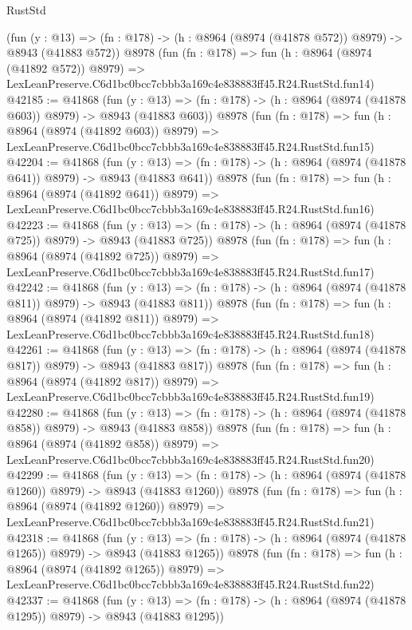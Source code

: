 \begin{lexlean}{RustStd}
\begin{coremodule}
    (fun (y : @13) => (fn : @178) -> (h : @8964 (@8974 (@41878 @572)) @8979) -> @8943 (@41883 @572))
    @8978
    (fun (fn : @178) =>
    fun (h : @8964 (@8974 (@41892 @572)) @8979) =>
    LexLeanPreserve.C6d1bc0bcc7cbbb3a169c4e838883ff45.R24.RustStd.fun14)
@42185 := @41868
    (fun (y : @13) => (fn : @178) -> (h : @8964 (@8974 (@41878 @603)) @8979) -> @8943 (@41883 @603))
    @8978
    (fun (fn : @178) =>
    fun (h : @8964 (@8974 (@41892 @603)) @8979) =>
    LexLeanPreserve.C6d1bc0bcc7cbbb3a169c4e838883ff45.R24.RustStd.fun15)
@42204 := @41868
    (fun (y : @13) => (fn : @178) -> (h : @8964 (@8974 (@41878 @641)) @8979) -> @8943 (@41883 @641))
    @8978
    (fun (fn : @178) =>
    fun (h : @8964 (@8974 (@41892 @641)) @8979) =>
    LexLeanPreserve.C6d1bc0bcc7cbbb3a169c4e838883ff45.R24.RustStd.fun16)
@42223 := @41868
    (fun (y : @13) => (fn : @178) -> (h : @8964 (@8974 (@41878 @725)) @8979) -> @8943 (@41883 @725))
    @8978
    (fun (fn : @178) =>
    fun (h : @8964 (@8974 (@41892 @725)) @8979) =>
    LexLeanPreserve.C6d1bc0bcc7cbbb3a169c4e838883ff45.R24.RustStd.fun17)
@42242 := @41868
    (fun (y : @13) => (fn : @178) -> (h : @8964 (@8974 (@41878 @811)) @8979) -> @8943 (@41883 @811))
    @8978
    (fun (fn : @178) =>
    fun (h : @8964 (@8974 (@41892 @811)) @8979) =>
    LexLeanPreserve.C6d1bc0bcc7cbbb3a169c4e838883ff45.R24.RustStd.fun18)
@42261 := @41868
    (fun (y : @13) => (fn : @178) -> (h : @8964 (@8974 (@41878 @817)) @8979) -> @8943 (@41883 @817))
    @8978
    (fun (fn : @178) =>
    fun (h : @8964 (@8974 (@41892 @817)) @8979) =>
    LexLeanPreserve.C6d1bc0bcc7cbbb3a169c4e838883ff45.R24.RustStd.fun19)
@42280 := @41868
    (fun (y : @13) => (fn : @178) -> (h : @8964 (@8974 (@41878 @858)) @8979) -> @8943 (@41883 @858))
    @8978
    (fun (fn : @178) =>
    fun (h : @8964 (@8974 (@41892 @858)) @8979) =>
    LexLeanPreserve.C6d1bc0bcc7cbbb3a169c4e838883ff45.R24.RustStd.fun20)
@42299 := @41868
    (fun (y : @13) =>
    (fn : @178) -> (h : @8964 (@8974 (@41878 @1260)) @8979) -> @8943 (@41883 @1260))
    @8978
    (fun (fn : @178) =>
    fun (h : @8964 (@8974 (@41892 @1260)) @8979) =>
    LexLeanPreserve.C6d1bc0bcc7cbbb3a169c4e838883ff45.R24.RustStd.fun21)
@42318 := @41868
    (fun (y : @13) =>
    (fn : @178) -> (h : @8964 (@8974 (@41878 @1265)) @8979) -> @8943 (@41883 @1265))
    @8978
    (fun (fn : @178) =>
    fun (h : @8964 (@8974 (@41892 @1265)) @8979) =>
    LexLeanPreserve.C6d1bc0bcc7cbbb3a169c4e838883ff45.R24.RustStd.fun22)
@42337 := @41868
    (fun (y : @13) =>
    (fn : @178) -> (h : @8964 (@8974 (@41878 @1295)) @8979) -> @8943 (@41883 @1295))

\end{coremodule}
\end{lexlean}
